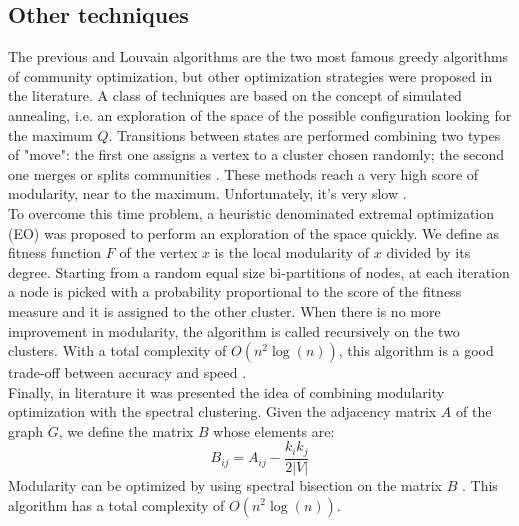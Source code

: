 \subsection{Other techniques}
The previous and Louvain algorithms are the two most famous greedy algorithms of community optimization, but other optimization strategies were proposed in the literature. A class of techniques are based on the concept of simulated annealing, i.e. an exploration of the space of the possible configuration looking for the maximum $Q$. 
Transitions between states are performed combining two types of "move": the first one assigns a vertex to a cluster chosen randomly; the second one merges or splits communities \cite{Guimer__2005}. These methods reach a very high score of modularity, near to the maximum. Unfortunately, it's very slow \cite{fortunato}. \\
To overcome this time problem, a heuristic denominated extremal optimization (EO) was proposed to perform an exploration of the space quickly. We define as fitness function $F$ of the vertex $x$ is the local modularity of $x$ divided by its degree. Starting from a random equal size bi-partitions of nodes, at each iteration a node is picked with a probability proportional to the score of the fitness measure and it is assigned to the other cluster. When there is no more improvement in modularity, the algorithm is called recursively on the two clusters. With a total complexity of $O(n^2 \log(n))$, this algorithm is a good trade-off between accuracy and speed \cite{eo}.\\ Finally, in literature it was presented the idea of combining modularity optimization with the spectral clustering. Given the adjacency matrix $A$ of the graph $G$, we define the matrix $B$ whose elements are:
\begin{equation}
B_{ij} = A_{ij} - \frac{k_ik_j}{2|V|}
\end{equation}
Modularity can be optimized by using spectral bisection on the matrix $B$ \cite{fortunato}. This algorithm has a total complexity of $O(n^2 \log(n))$.